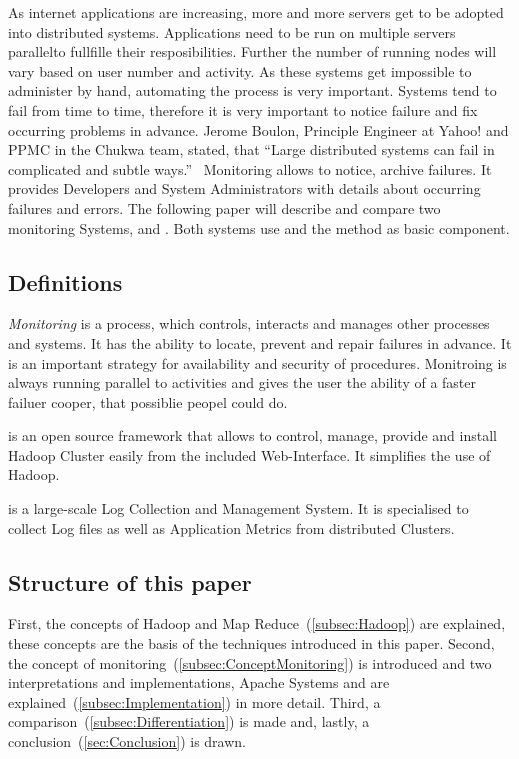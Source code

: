 As internet applications are increasing, more and more servers get to be adopted into distributed systems. Applications need to be run on multiple servers parallelto fullfille their resposibilities. Further the number of running nodes will vary based on user number and activity. As these systems get impossible to administer by hand, automating the process is very important. Systems tend to fail from time to time, therefore it is very important to notice failure and fix occurring problems in advance. Jerome Boulon, Principle Engineer at Yahoo! and PPMC in the Chukwa team, stated, that ``Large distributed systems can fail in complicated and subtle ways.''~\cite{Boulonb} Monitoring allows to notice, archive failures. It provides Developers and System Administrators with details about occurring failures and errors. The following paper will describe and compare two monitoring Systems, \amb and \chuk. Both systems use \hadoop and the \mr method as basic component.


\subsection{Definitions}

\textit{Monitoring} is a process, which controls, interacts and manages other processes and systems. It has the ability to locate, prevent and repair failures in advance. It is an important strategy for availability and security of procedures. Monitroing is always running parallel to activities and gives the user the ability of a faster failuer cooper, that possiblie peopel could do.

\amb is an open source framework that allows to control, manage, provide and install Hadoop Cluster easily from the included Web-Interface. It simplifies the use of Hadoop.

\chuk is a large-scale Log Collection and Management System. It is specialised to collect Log files as well as Application Metrics from distributed Clusters.

\subsection{Structure of this paper}
First, the concepts of Hadoop and Map Reduce~(\ref{subsec:Hadoop}) are explained, these concepts are the basis of the techniques introduced in this paper. 
Second, the concept of monitoring~(\ref{subsec:ConceptMonitoring}) is introduced and two interpretations and implementations, Apache Systems \amb and \chuk are explained~(\ref{subsec:Implementation}) in more detail. 
Third, a comparison~(\ref{subsec:Differentiation}) is made and, lastly, a conclusion~(\ref{sec:Conclusion}) is drawn.


